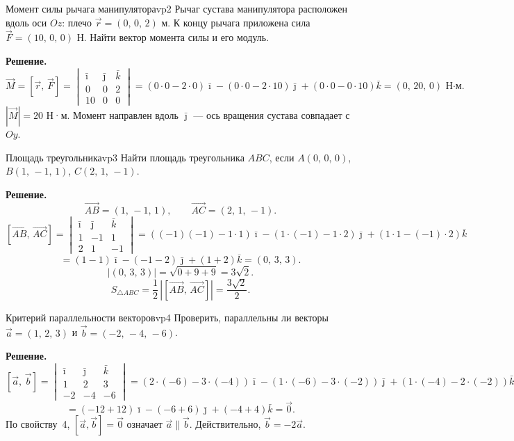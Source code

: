 \documentclass[12pt,a4paper]{article}
\newcommand{\vi}{\bar{\imath}}
\newcommand{\vj}{\bar{\jmath}}
\newcommand{\vk}{\bar{k}}
\begin{document}
\begin{exampleBox}{Момент силы рычага манипулятора}{vp2}
  Рычаг сустава манипулятора расположен вдоль оси $Oz$: плечо
  $\vec{r} = (0,\,0,\,2)$ м. К концу рычага приложена сила
  $\vec{F} = (10,\,0,\,0)$ Н. Найти вектор момента силы и его модуль.

  \textbf{Решение.}
  \[
    \vec{M} = [\vec{r},\,\vec{F}] =
    \begin{vmatrix} \vi & \vj & \vk \\ 0 & 0 & 2 \\ 10 & 0 & 0
    \end{vmatrix}
    = (0{\cdot}0 - 2{\cdot}0)\vi - (0{\cdot}0 - 2{\cdot}10)\vj
    + (0{\cdot}0 - 0{\cdot}10)\vk
    = (0,\,20,\,0) \text{ Н·м.}
  \]
  $|\vec{M}| = 20$ Н·м. Момент направлен вдоль $\vj$ --- ось вращения
  сустава совпадает с $Oy$.
\end{exampleBox}

\begin{exampleBox}{Площадь треугольника}{vp3}
  Найти площадь треугольника $ABC$, если $A(0,\,0,\,0)$,
  $B(1,\,-1,\,1)$, $C(2,\,1,\,-1)$.

  \textbf{Решение.}
  \[
    \overrightarrow{AB} = (1,\,-1,\,1), \qquad
    \overrightarrow{AC} = (2,\,1,\,-1).
  \]
  \[
    [\overrightarrow{AB},\,\overrightarrow{AC}] =
    \begin{vmatrix} \vi & \vj & \vk \\ 1 & -1 & 1 \\ 2 & 1 & -1
    \end{vmatrix}
    = ((-1)(-1) - 1{\cdot}1)\vi - (1{\cdot}(-1) - 1{\cdot}2)\vj
    + (1{\cdot}1 - (-1){\cdot}2)\vk
  \]
  \[
    = (1-1)\vi - (-1-2)\vj + (1+2)\vk = (0,\,3,\,3).
  \]
  \[
    |(0,\,3,\,3)| = \sqrt{0+9+9} = 3\sqrt{2}.
  \]
  \[
    S_{\triangle ABC} = \frac{1}{2}\,|[\overrightarrow{AB},\,
    \overrightarrow{AC}]| = \frac{3\sqrt{2}}{2}.
  \]
\end{exampleBox}

\begin{exampleBox}{Критерий параллельности векторов}{vp4}
  Проверить, параллельны ли векторы $\vec{a} = (1,\,2,\,3)$ и
  $\vec{b} = (-2,\,-4,\,-6)$.

  \textbf{Решение.}
  \[
    [\vec{a},\,\vec{b}] =
    \begin{vmatrix} \vi & \vj & \vk \\ 1 & 2 & 3 \\ -2 & -4 & -6
    \end{vmatrix}
    = (2{\cdot}(-6) - 3{\cdot}(-4))\vi - (1{\cdot}(-6) - 3{\cdot}(-2))\vj
    + (1{\cdot}(-4) - 2{\cdot}(-2))\vk
  \]
  \[
    = (-12+12)\vi - (-6+6)\vj + (-4+4)\vk = \vec{0}.
  \]
  По свойству~4, $[\vec{a},\vec{b}] = \vec{0}$ означает
  $\vec{a} \parallel \vec{b}$. Действительно, $\vec{b} = -2\vec{a}$.
\end{exampleBox}
\end{document}
